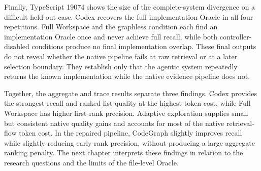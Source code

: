 Finally, TypeScript 19074 shows the size of the complete-system divergence on a difficult held-out case. Codex recovers the full implementation Oracle in all four repetitions. Full Workspace and the graphless condition each find an implementation Oracle once and never achieve full recall, while both controller-disabled conditions produce no final implementation overlap. These final outputs do not reveal whether the native pipeline fails at raw retrieval or at a later selection boundary. They establish only that the agentic system repeatedly returns the known implementation while the native evidence pipeline does not.

Together, the aggregate and trace results separate three findings. Codex provides the strongest recall and ranked-list quality at the highest token cost, while Full Workspace has higher first-rank precision. Adaptive exploration supplies small but consistent native quality gains and accounts for most of the native retrieval-flow token cost. In the repaired pipeline, CodeGraph slightly improves recall while slightly reducing early-rank precision, without producing a large aggregate ranking penalty. The next chapter interprets these findings in relation to the research questions and the limits of the file-level Oracle.
